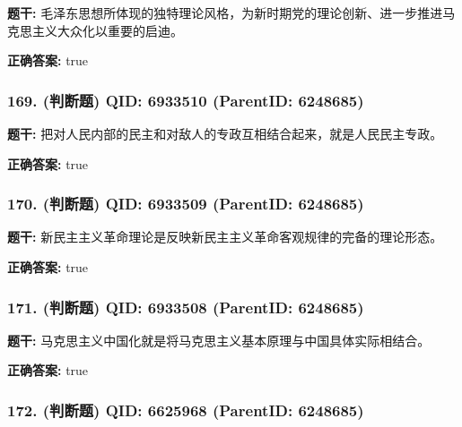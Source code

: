 \documentclass[12pt,UTF8]{ctexart}
\begin{document}
\textbf{题干:}
毛泽东思想所体现的独特理论风格，为新时期党的理论创新、进一步推进马克思主义大众化以重要的启迪。



\textbf{正确答案:}
true

\vspace{0.3em}\hrulefill\vspace{0.7em}

\subsubsection*{169. (判断题) \small QID: 6933510 (ParentID: 6248685)}

\textbf{题干:}
把对人民内部的民主和对敌人的专政互相结合起来，就是人民民主专政。



\textbf{正确答案:}
true

\vspace{0.3em}\hrulefill\vspace{0.7em}

\subsubsection*{170. (判断题) \small QID: 6933509 (ParentID: 6248685)}

\textbf{题干:}
新民主主义革命理论是反映新民主主义革命客观规律的完备的理论形态。



\textbf{正确答案:}
true

\vspace{0.3em}\hrulefill\vspace{0.7em}

\subsubsection*{171. (判断题) \small QID: 6933508 (ParentID: 6248685)}

\textbf{题干:}
马克思主义中国化就是将马克思主义基本原理与中国具体实际相结合。



\textbf{正确答案:}
true

\vspace{0.3em}\hrulefill\vspace{0.7em}

\subsubsection*{172. (判断题) \small QID: 6625968 (ParentID: 6248685)}
\end{document}
